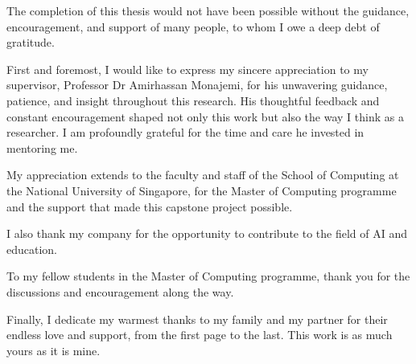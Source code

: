 \begin{acknowledgments}

    The completion of this thesis would not have been possible without the
    guidance, encouragement, and support of many people, to whom I owe a
    deep debt of gratitude.

    First and foremost, I would like to express my sincere appreciation to my
    supervisor, Professor Dr Amirhassan Monajemi, for his unwavering guidance,
    patience, and insight throughout this research. His thoughtful feedback and
    constant encouragement shaped not only this work but also the way I think
    as a researcher. I am profoundly grateful for the time and care he invested
    in mentoring me.

    My appreciation extends to the faculty and staff of the School of Computing
    at the National University of Singapore, for the Master of Computing
    programme and the support that made this capstone project possible.

    I also thank my company for the opportunity to contribute to the field of
    AI and education.

    To my fellow students in the Master of Computing programme, thank you for
    the discussions and encouragement along the way.

    Finally, I dedicate my warmest thanks to my family and my partner for
    their endless love and support, from the first page to the last. This work
    is as much yours as it is mine.


\end{acknowledgments}
